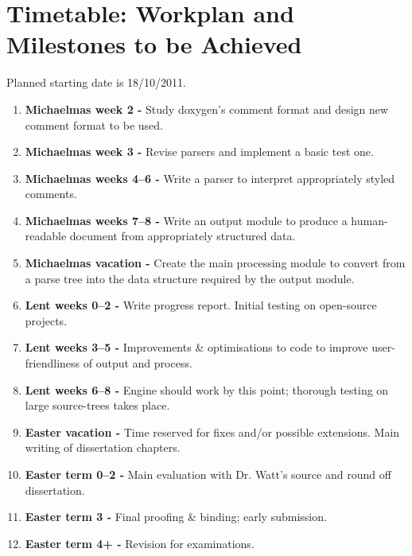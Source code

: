 \section{Timetable: Workplan and Milestones to be Achieved}

Planned starting date is 18/10/2011.

\begin{enumerate}

\item {\bf Michaelmas week 2 -} Study doxygen's comment format and
  design new comment format to be used.

\item {\bf Michaelmas week 3 -} Revise parsers and implement a basic
  test one.

\item {\bf Michaelmas weeks 4--6 -} Write a parser to interpret
  appropriately styled comments.

\item {\bf Michaelmas weeks 7--8 -} Write an output module to produce a
  human-readable document from appropriately structured data.

\item {\bf Michaelmas vacation -} Create the main processing module to
  convert from a parse tree into the data structure required by the
  output module.

\item {\bf Lent weeks 0--2 -} Write progress report. Initial testing on
  open-source projects.

\item {\bf Lent weeks 3--5 -} Improvements \& optimisations to code to
  improve user-friendliness of output and process.

\item {\bf Lent weeks 6--8 -} Engine should work by this point; thorough
  testing on large source-trees takes place.

\item {\bf Easter vacation -} Time reserved for fixes and/or possible
  extensions. Main writing of dissertation chapters.

\item {\bf Easter term 0--2 -} Main evaluation with Dr. Watt's source and round off dissertation.

\item {\bf Easter term 3 -} Final proofing \& binding; early submission.

\item {\bf Easter term 4+ -} Revision for examinations.

\end{enumerate}


 


